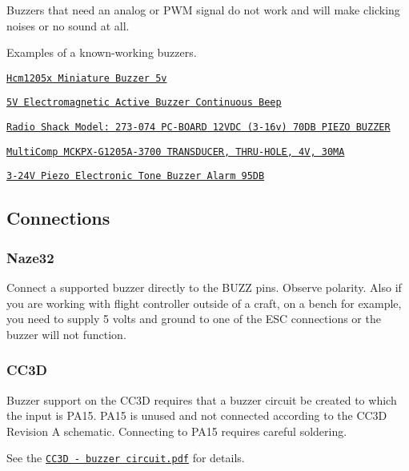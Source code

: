 Buzzers that need an analog or P\+W\+M signal do not work and will make clicking noises or no sound at all.

Examples of a known-\/working buzzers.


\begin{DoxyItemize}
\item \href{http://www.rapidonline.com/Audio-Visual/Hcm1205x-Miniature-Buzzer-5v-35-0055}{\tt Hcm1205x Miniature Buzzer 5v}
\item \href{http://www.banggood.com/10Pcs-5V-Electromagnetic-Active-Buzzer-Continuous-Beep-Continuously-p-943524.html}{\tt 5\+V Electromagnetic Active Buzzer Continuous Beep}
\item \href{http://www.radioshack.com/pc-board-12vdc-70db-piezo-buzzer/2730074.html#.VIAtpzHF_Si}{\tt Radio Shack Model\+: 273-\/074 P\+C-\/\+B\+O\+A\+R\+D 12\+V\+D\+C (3-\/16v) 70\+D\+B P\+I\+E\+Z\+O B\+U\+Z\+Z\+E\+R}
\item \href{http://uk.farnell.com/multicomp/mckpx-g1205a-3700/transducer-thru-hole-4v-30ma/dp/2135914?CMP=i-bf9f-00001000}{\tt Multi\+Comp M\+C\+K\+P\+X-\/\+G1205\+A-\/3700 T\+R\+A\+N\+S\+D\+U\+C\+E\+R, T\+H\+R\+U-\/\+H\+O\+L\+E, 4\+V, 30\+M\+A}
\item \href{http://www.banggood.com/3-24V-Piezo-Electronic-Tone-Buzzer-Alarm-95DB-Continuous-Sound-p-919348.html}{\tt 3-\/24\+V Piezo Electronic Tone Buzzer Alarm 95\+D\+B}
\end{DoxyItemize}

\subsection*{Connections}

\subsubsection*{Naze32}

Connect a supported buzzer directly to the B\+U\+Z\+Z pins. Observe polarity. Also if you are working with flight controller outside of a craft, on a bench for example, you need to supply 5 volts and ground to one of the E\+S\+C connections or the buzzer will not function.

\subsubsection*{C\+C3\+D}

Buzzer support on the C\+C3\+D requires that a buzzer circuit be created to which the input is P\+A15. P\+A15 is unused and not connected according to the C\+C3\+D Revision A schematic. Connecting to P\+A15 requires careful soldering.

See the \href{Wiring/CC3D - buzzer circuit.pdf}{\tt C\+C3\+D -\/ buzzer circuit.\+pdf} for details. 